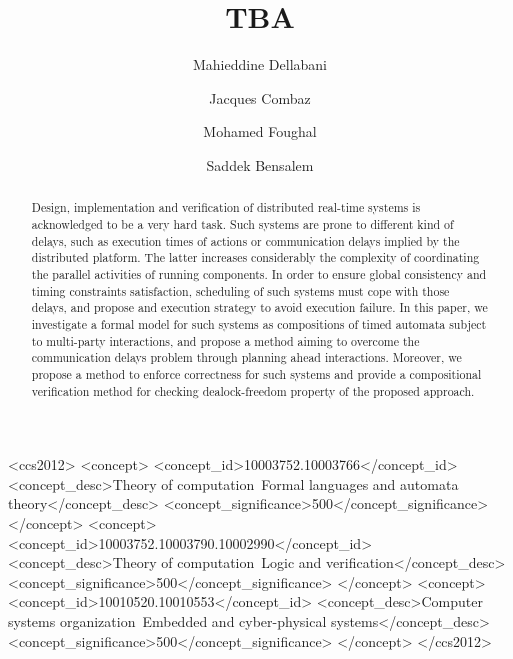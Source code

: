 \documentclass[format=acmtog]{acmart}
\begin{document}
\title{TBA}
\author{Mahieddine Dellabani}
\author{Jacques Combaz}
\author{Mohamed Foughal}
\author{Saddek Bensalem}



\renewcommand\shortauthors{Dellabani, Combaz, Foughal et al}



\begin{abstract}
Design, implementation and verification of distributed real-time systems is acknowledged to be a very hard task.
Such systems are prone to different kind of delays, such as execution times of actions or communication delays implied by the distributed platform.
The latter increases considerably the complexity of coordinating the parallel activities of running components.
In order to ensure global consistency and timing constraints satisfaction, scheduling of such systems must cope with those delays, and propose and execution strategy to avoid execution failure. 
In this paper, we investigate a formal model for such systems as compositions of timed automata subject to multi-party interactions, and propose 
a method aiming to overcome the communication delays problem through planning ahead interactions. Moreover, we propose a method to enforce correctness for such systems
and provide a compositional verification method for checking dealock-freedom property of the proposed approach.
\end{abstract}


\begin{CCSXML}
  <ccs2012>
  <concept>
  <concept_id>10003752.10003766</concept_id>
  <concept_desc>Theory of computation~Formal languages and automata theory</concept_desc>
  <concept_significance>500</concept_significance>
  </concept>
  <concept>
  <concept_id>10003752.10003790.10002990</concept_id>
  <concept_desc>Theory of computation~Logic and verification</concept_desc>
  <concept_significance>500</concept_significance>
  </concept>
  <concept>
  <concept_id>10010520.10010553</concept_id>
  <concept_desc>Computer systems organization~Embedded and cyber-physical systems</concept_desc>
  <concept_significance>500</concept_significance>
  </concept>
  </ccs2012>
\end{CCSXML}
\end{document}
